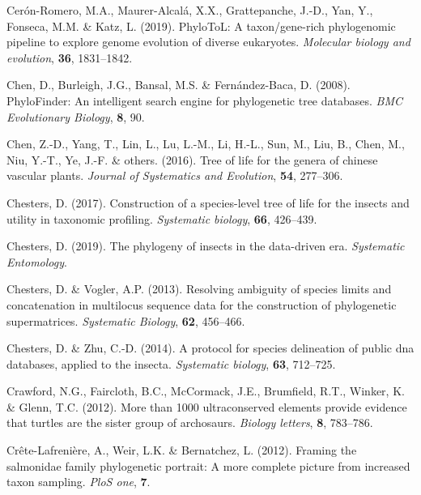 \documentclass[]{article}
\begin{document}
\leavevmode\hypertarget{ref-ceron2019phylotol}{}%
Cerón-Romero, M.A., Maurer-Alcalá, X.X., Grattepanche, J.-D., Yan, Y., Fonseca, M.M. \& Katz, L. (2019). PhyloToL: A taxon/gene-rich phylogenomic pipeline to explore genome evolution of diverse eukaryotes. \emph{Molecular biology and evolution}, \textbf{36}, 1831--1842.

\leavevmode\hypertarget{ref-chen2008phylofinder}{}%
Chen, D., Burleigh, J.G., Bansal, M.S. \& Fernández-Baca, D. (2008). PhyloFinder: An intelligent search engine for phylogenetic tree databases. \emph{BMC Evolutionary Biology}, \textbf{8}, 90.

\leavevmode\hypertarget{ref-chen2016tree}{}%
Chen, Z.-D., Yang, T., Lin, L., Lu, L.-M., Li, H.-L., Sun, M., Liu, B., Chen, M., Niu, Y.-T., Ye, J.-F. \& others. (2016). Tree of life for the genera of chinese vascular plants. \emph{Journal of Systematics and Evolution}, \textbf{54}, 277--306.

\leavevmode\hypertarget{ref-chesters2017construction}{}%
Chesters, D. (2017). Construction of a species-level tree of life for the insects and utility in taxonomic profiling. \emph{Systematic biology}, \textbf{66}, 426--439.

\leavevmode\hypertarget{ref-chesters2019phylogeny}{}%
Chesters, D. (2019). The phylogeny of insects in the data-driven era. \emph{Systematic Entomology}.

\leavevmode\hypertarget{ref-chesters2013resolving}{}%
Chesters, D. \& Vogler, A.P. (2013). Resolving ambiguity of species limits and concatenation in multilocus sequence data for the construction of phylogenetic supermatrices. \emph{Systematic Biology}, \textbf{62}, 456--466.

\leavevmode\hypertarget{ref-chesters2014protocol}{}%
Chesters, D. \& Zhu, C.-D. (2014). A protocol for species delineation of public dna databases, applied to the insecta. \emph{Systematic biology}, \textbf{63}, 712--725.

\leavevmode\hypertarget{ref-crawford2012more}{}%
Crawford, N.G., Faircloth, B.C., McCormack, J.E., Brumfield, R.T., Winker, K. \& Glenn, T.C. (2012). More than 1000 ultraconserved elements provide evidence that turtles are the sister group of archosaurs. \emph{Biology letters}, \textbf{8}, 783--786.

\leavevmode\hypertarget{ref-crete2012salmonidae}{}%
Crête-Lafrenière, A., Weir, L.K. \& Bernatchez, L. (2012). Framing the salmonidae family phylogenetic portrait: A more complete picture from increased taxon sampling. \emph{PloS one}, \textbf{7}.
\end{document}
